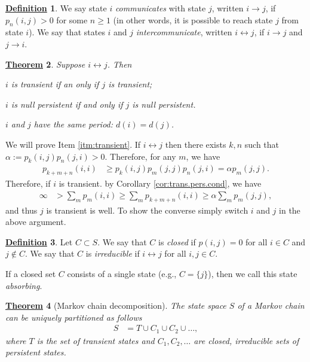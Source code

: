 \documentclass[12pt]{book}
\numberwithin{equation}{chapter}
\theoremstyle{plain}
\newtheorem{theorem}{\underline{Theorem}}
\numberwithin{theorem}{section}
\theoremstyle{definition}
\newtheorem{definition}[theorem]{\underline{Definition}}
\numberwithin{exercise}{chapter}
\let\oldendproof\endproof
\renewenvironment{proof}[1][\proofname]{%
  \oldproof[\scshape\underline{#1}]%
}{\oldendproof}
\newcommand{\<}{\langle}
\renewcommand{\>}{\rangle}
\renewcommand{\(}{\left(}
\renewcommand{\)}{\right)}
\renewcommand{\[}{\left[}
\renewcommand{\]}{\right]}
\begin{document}
\begin{definition}
We say state $i$ \emph{communicates} with state $j$, written $i \to j$, if $p_n(i,j)>0$ for some $n \geq 1$ (in other words, it is possible to reach state $j$ from state $i$).  We say that states $i$ and $j$ \emph{intercommunicate}, written $i \leftrightarrow j$, if $i \to j$ and $j \to i$.
\end{definition}

\begin{theorem}
\label{thm:equivalence}
Suppose $i \leftrightarrow j$.  Then 
\begin{enumerate*}
\item $i$ is transient if an only if $j$ is transient; \label{itm:transient}
\item $i$ is null persistent if and only if $j$ is null persistent. \label{itm:null.persistent}
\item $i$ and $j$ have the same period: $d(i) = d(j)$.
\end{enumerate*}
\end{theorem}

\begin{proof}
We will prove Item \ref{itm:transient}.
If $i \leftrightarrow j$ then there exists $k,n$ such that $\alpha := p_k(i,j) p_n(j,i) >0$.  Therefore, for any $m$, we have
\begin{align}
p_{k+m+n}(i,i)
	&\geq p_k(i,j) p_m(j,j) p_n(j,i)
	=	\alpha p_m(j,j) .
\end{align}
Therefore, if $i$ is transient. by Corollary \ref{cor:trans.pers.cond}, we have
\begin{align}
\infty
	&>	\sum_m p_m(i,i)
	\geq \sum_m p_{k+m+n}(i,i)
	\geq	\alpha \sum_m p_m(j,j) ,
\end{align}
and thus $j$ is transient is well.  To show the converse simply switch $i$ and $j$ in the above argument.
\end{proof}

\begin{definition}
Let $C \subset S$.  We say that $C$ is \emph{closed} if $p(i,j) = 0$ for all $i \in C$ and $j \notin C$.
We say that $C$ is \emph{irreducible} if $i \leftrightarrow j$ for all $i,j \in C$.
\end{definition}

\noindent
If a closed set $C$ consists of a single state (e.g., $C = \{j\}$), then we call this state \emph{absorbing}.

\begin{theorem}[Markov chain decomposition]
\label{thm:mc.decomp}
The state space $S$ of a Markov chain can be uniquely partitioned as follows
\begin{align}
S
	&=	T \cup C_1 \cup C_2 \cup \ldots ,
\end{align}
where $T$ is the set of transient states and $C_1, C_2, \ldots$ are closed, irreducible sets of persistent states.
\end{theorem}
\end{document}
